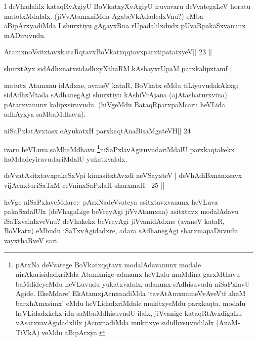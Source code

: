 \begin{artha}
I deVhadalilx kataqRvAgiyU BoVkatxyXvAgiyU iruvavaru deVvategaLeV horatu matotxMdalalx. (jiVvAtamxniMda AgabeVkAdadedxVnu?) eMba aBipArxyadiMda I shurxtiyu gAgayxRna rUpadalilxdudx pUvaRpakaSxvanunx mADiruvudu.
\end{artha}

\begin{shl}
AtamxnoV\s sitxtavxkataRqtavxBoVkatxqqtavxparxtipatatxyeV\hfill || 23 ||
\end{shl}

\begin{shl}
shurxtAyx sidAdhxnatxsidadhxyXthaRM kAshayxrUpaM parxkalipxtamf |
\end{shl}

\begin{artha}
matutx Atamxnu idAdxne, avaneV kataR, BoVkatx eMdu tiLiyuvudakAkxgi sidAdhxMtada sAdhanegAgi shurxtiyu kAshiVrAjana (ajAtashaturxvina) pAtarxvanunx kalipxsiruvudu. (hiVgeMdu BataqRparxpaMcaru heVLida adhAyxya saMbaMdhavu).
\end{artha} 
 

\begin{shl}
niSaPxlatAvxtasx cAyukatxH parxkaqtAnaBisaMgateVH\hfill || 24 ||
\end{shl}

\begin{artha}
ivaru heVLuva saMbaMdhavu \footnote{pArxNa deVvatege BoVkatxqqtavx 
modalAdavanunx modale nirAkarisidadxriMda Atamxnige adanunx heVLalu 
muMdina garxMthavu baMdideyeMdu heVLuvudu yukatxvalalx, adanunx sAdhisuvudu niSaPxlavU Agide. EkeMdare! EkAtamxjAcnxnadiMda `tavAtAmxnameVvAveVtf ahaM barxhAmxsimx' eMdu heVLidadxriMdale mukitxyeMdu parxkaqta. modalu heVLidadxkekx idu saMbaMdhisuvudU ilalx, jiVvanige kataqRtAvxdigaLu vAsatxvavAgidadxlilx jAcnxnadiMda mukitxye sididhxsuvudilalx (AnaM-TiVkA) veMdu aBipArxya.
}niSaPxlavAgiruvudariMdalU parxkaqtakekx hoMdadeyiruvudariMdalU yukatxvalalx.
\end{artha}

\begin{shl}
deVvatAsitxtavxpakeSxV\s pi kimasitxtAvxdi neVSayxteV |
deVhAdiBxnanxsayx vijAcnxturiSaTxM ceVninxSaPxlaH sharxmaH\hfill || 25 ||
\end{shl}

\begin{artha}
heVge niSaPxlaveMdare:- pArxNadeVvateya asitxtavxvanunx heVLuva  pakaSxdalUlx (deVhagaLige beVreyAgi jiVvAtamxna) asitxtavx modalAdavu  iSaTxvalalxveVnu? deVhakekx beVreyAgi jiVvanidAdxne (avaneV kataR, BoVkatx) eMbudu iSaTxvAgidadxre, adara sAdhanegAgi sharxmapaDuvudu vayxthaRveV sari.
\end{artha}

